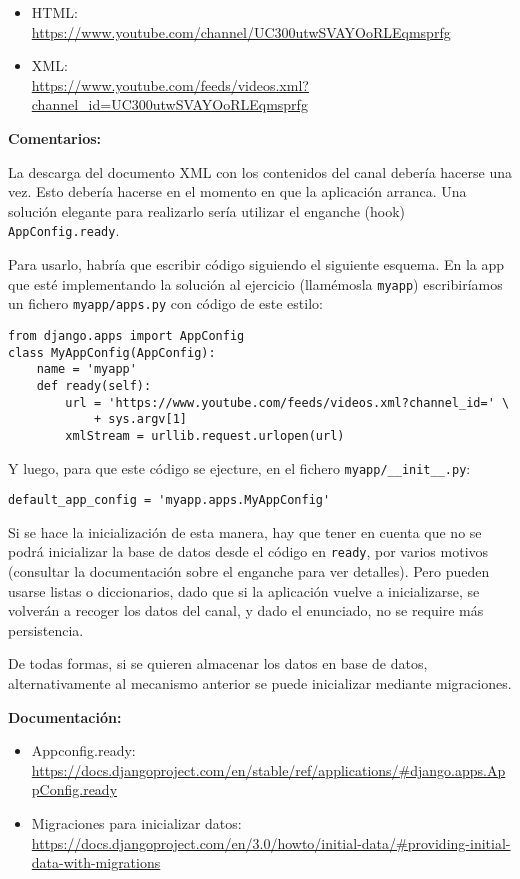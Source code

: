 \begin{itemize}
\item HTML: \\
  \url{https://www.youtube.com/channel/UC300utwSVAYOoRLEqmsprfg}
\item XML: \\
  \url{https://www.youtube.com/feeds/videos.xml?channel_id=UC300utwSVAYOoRLEqmsprfg}
\end{itemize}

\textbf{Comentarios:}

La descarga del documento XML con los contenidos del canal debería hacerse una vez. Esto debería hacerse en el momento en que la aplicación arranca. Una solución elegante para realizarlo sería utilizar el enganche (hook) \verb|AppConfig.ready|.

Para usarlo, habría que escribir código siguiendo el siguiente esquema. En la app que esté implementando la solución al ejercicio (llamémosla \verb|myapp|) escribiríamos un fichero \verb|myapp/apps.py| con código de este estilo:

\begin{verbatim}
from django.apps import AppConfig
class MyAppConfig(AppConfig):
    name = 'myapp'
    def ready(self):
        url = 'https://www.youtube.com/feeds/videos.xml?channel_id=' \
            + sys.argv[1]
        xmlStream = urllib.request.urlopen(url)
\end{verbatim}

Y luego, para que este código se ejecture, en el fichero \verb|myapp/__init__.py|:

\begin{verbatim}
default_app_config = 'myapp.apps.MyAppConfig'
\end{verbatim}

Si se hace la inicialización de esta manera, hay que tener en cuenta que no se podrá inicializar la base de datos desde el código en \verb|ready|, por varios motivos (consultar la documentación sobre el enganche para ver detalles). Pero pueden usarse listas o diccionarios, dado que si la aplicación vuelve a inicializarse, se volverán a recoger los datos del canal, y dado el enunciado, no se require más persistencia.

De todas formas, si se quieren almacenar los datos en base de datos, alternativamente al mecanismo anterior se puede inicializar mediante migraciones.

\textbf{Documentación:}

\begin{itemize}
\item Appconfig.ready: \\
\url{https://docs.djangoproject.com/en/stable/ref/applications/#django.apps.AppConfig.ready}

\item Migraciones para inicializar datos: \\
\url{https://docs.djangoproject.com/en/3.0/howto/initial-data/#providing-initial-data-with-migrations}
\end{itemize}

